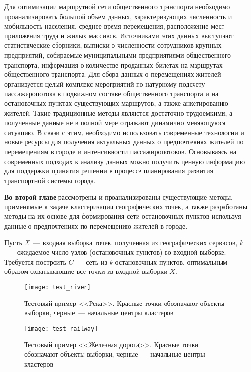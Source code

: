 Для оптимизации маршрутной сети общественного транспорта необходимо проанализировать большой объем данных, характеризующих численность и мобильность населения, среднее время перемещения, расположение мест приложения труда и жилых массивов. Источниками этих данных выступают статистические сборники, выписки о численности сотрудников крупных предприятий, собираемые муниципальными предприятиями общественного транспорта, информация о количестве проданных билетах на маршрутах общественного транспорта. Для сбора данных о перемещениях жителей организуется целый комплекс мероприятий по натурному подсчету пассажиропотока в подвижном составе общественного транспорта и на остановочных пунктах существующих маршрутов, а также анкетированию жителей. Такие традиционные методы являются достаточно трудоемкими, а полученные данные не в полной мере отражают динамично меняющуюся ситуацию. В связи с этим, необходимо использовать современные технологии и новые ресурсы для получения актуальных данных о предпочтениях жителей по перемещениям в городе и интенсивности пассажиропотоков. Основываясь на современных подходах к анализу данных можно получить ценную информацию для поддержки принятия решений в процессе планирования развития транспортной системы города.

\textbf{Во второй главе} рассмотрены и проанализированы существующие методы, применимые к задаче кластеризации географических точек, а также разработаны методы на их основе для формирования сети остановочных пунктов используя данные о предпочтениях по перемещению жителей в городе.

Пусть \( X \)~--- входная выборка точек, полученная из географических сервисов, \( k \)~--- ожидаемое число узлов (остановочных пунктов) во входной выборке. Требуется построить \( C \)~--- сеть из \( k \) остановочных пунктов, оптимальным образом охватывающие все точки из входной выборки \( X \).

\begin{figure}[b!]
    \centering
    \texttt{[image: test\_river]}\\[1ex]
    \parbox{.7\textwidth}{\caption{Тестовый пример <<Река>>. Красные точки обозначают объекты выборки, черные~--- начальные центры кластеров} \label{img:river}}
    \texttt{[image: test\_railway]}\\[1ex]
    \parbox{.7\textwidth}{\caption{Тестовый пример <<Железная дорога>>. Красные точки обозначают объекты выборки, черные~--- начальные центры кластеров} \label{img:railway}}
\end{figure}

